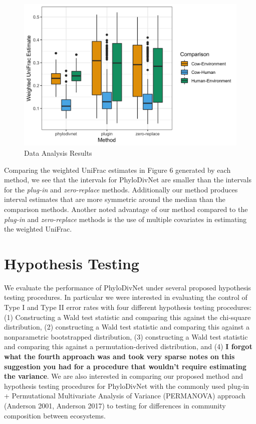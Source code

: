 \documentclass{article}
\newcommand*{\myfont}{\fontfamily{lmtt}\selectfont}
\begin{document}
\begin{figure}[!htb]
 \captionsetup{singlelinecheck = false, format= hang, justification = raggedright, font = sf, labelsep = space}
  \caption{Data Analysis Results}
  \centering
  \includegraphics[width=\textwidth]{HDWanalysis_plots_B100_3methods.png}
\end{figure}

Comparing the weighted UniFrac estimates in Figure 6 generated by each method, we see that the intervals for {\myfont PhyloDivNet} are smaller than the intervals for the \textit{plug-in} and \textit{zero-replace} methods. Additionally our method produces interval estimates that are more symmetric around the median than the comparison methods. Another noted advantage of our method compared to the \textit{plug-in} and \textit{zero-replace} methods is the use of multiple covariates in estimating the weighted UniFrac.

\section{Hypothesis Testing}
We evaluate the performance of PhyloDivNet under several proposed hypothesis testing procedures. In particular we were interested in evaluating the control of Type I and Type II error rates with four different hypothesis testing procedures: (1) Constructing a Wald test statistic and comparing this against the chi-square distribution, (2) constructing a Wald test statistic and comparing this against a nonparametric bootstrapped distribution, (3) constructing a Wald test statistic and comparing this against a permutation-derived distribution, and (4) \textbf{I forgot what the fourth approach was and took very sparse notes on this suggestion you had for a procedure that wouldn't require estimating the variance}. We are also interested in comparing our proposed method and hypothesis testing procedures for PhyloDivNet with the commonly used plug-in + Permutational Multivariate Analysis of Variance (PERMANOVA) approach (Anderson 2001, Anderson 2017) to testing for differences in community composition between ecosystems.
\end{document}
